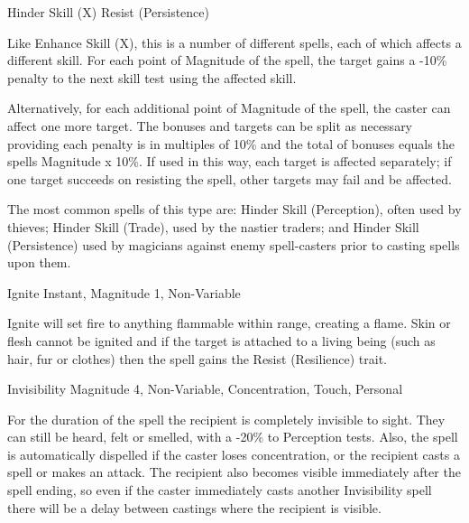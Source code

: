 \begin{rpg-spell}
{Hinder Skill (X)}
{Resist (Persistence)}

Like Enhance Skill (X), this is a number of different spells, each of which affects a different skill. For each point of Magnitude of the spell, the target gains a -10\% penalty to the next skill test using the affected skill.

Alternatively, for each additional point of Magnitude of the spell, the caster can affect one more target.  The bonuses and targets can be split as necessary providing each penalty is in multiples of 10\% and the total of bonuses equals the spells Magnitude x 10\%. If used in this way, each target is affected separately; if one target succeeds on resisting the spell, other targets may fail and be affected.

The most common spells of this type are: Hinder Skill (Perception), often used by thieves; Hinder Skill (Trade), used by the nastier traders; and Hinder Skill (Persistence) used by magicians against enemy spell-casters prior to casting spells upon them.
\end{rpg-spell}


\begin{rpg-spell}
{Ignite}
{Instant, Magnitude 1, Non-Variable}

Ignite will set fire to anything flammable within range, creating a flame. Skin or flesh cannot be ignited and if the target is attached to a living being (such as hair, fur or clothes) then the spell gains the Resist (Resilience) trait. 
\end{rpg-spell}


\begin{rpg-spell}
{Invisibility}
{Magnitude 4, Non-Variable, Concentration, Touch, Personal}

For the duration of the spell the recipient is completely invisible to sight. They can still be heard, felt or smelled, with a -20\% to Perception tests. Also, the spell is automatically dispelled if the caster loses concentration, or the recipient casts a spell or makes an attack. The recipient also becomes visible immediately after the spell ending, so even if the caster immediately casts another Invisibility spell there will be a delay between castings where the recipient is visible.
\end{rpg-spell}


